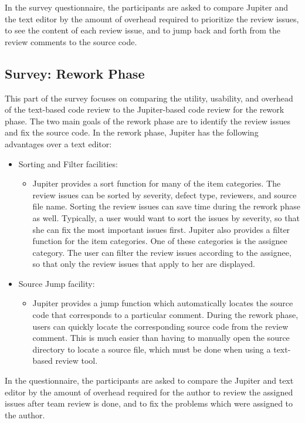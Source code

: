 In the survey questionnaire, the participants are asked to compare Jupiter and the text editor by the amount of overhead required to prioritize the review issues, to see the content of each review issue, and to jump back and forth from the review comments to the source code. 

\subsection{Survey: Rework Phase}
\label{subsec:survey:-rework-phase}

This part of the survey focuses on comparing the utility, usability, and overhead of the text-based code review to the Jupiter-based code review for the rework phase. The two main goals of the rework phase are to identify the review issues and fix the source code. In the rework phase, Jupiter has the following advantages over a text editor:

\begin{itemize}
	\item Sorting and Filter facilities:
		\begin{itemize}
			\item Jupiter provides a sort function for many of the item categories. The review issues can be sorted by severity, defect type, reviewers, and source file name. Sorting the review issues can save time during the rework phase as well. Typically, a user would want to sort the issues by severity, so that she can fix the most important issues first. Jupiter also provides a filter function for the item categories. One of these categories is the assignee category. The user can filter the review issues according to the assignee, so that only the review issues that apply to her are displayed.
		\end{itemize}
	\item Source Jump facility:
		\begin{itemize}
			\item Jupiter provides a jump function which automatically locates the source code that corresponds to a particular comment. During the rework phase, users can quickly locate the corresponding source code from the review comment. This is much easier than having to manually open the source directory to locate a source file, which must be done when using a text-based review tool.
		\end{itemize}
\end{itemize}

In the questionnaire, the participants are asked to compare the Jupiter and text editor by the amount of overhead required for the author to review the assigned issues after team review is done, and to fix the problems which were assigned to the author.

